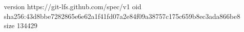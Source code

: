 version https://git-lfs.github.com/spec/v1
oid sha256:43d8bbe7282865e6e62a1f41fd07a2e84f09a38757c175c659b8ec3ada866be8
size 134429
